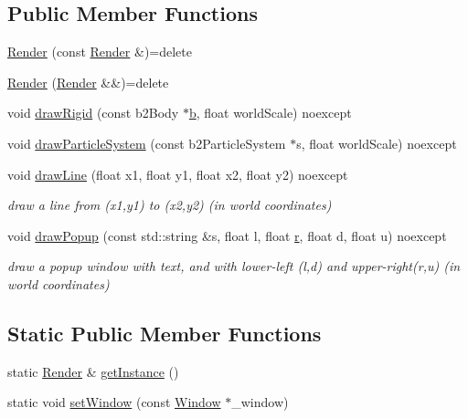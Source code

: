 \subsection*{Public Member Functions}
\begin{DoxyCompactItemize}
\item 
\hyperlink{classRender_a9efce92fa87e96980f4e413ee0cb6843}{Render} (const \hyperlink{classRender}{Render} \&)=delete
\item 
\hyperlink{classRender_a6e1a004027eff97cb3dfc9f012dde498}{Render} (\hyperlink{classRender}{Render} \&\&)=delete
\item 
void \hyperlink{classRender_a18f55be699e0bd8d20a5462330d5c9df}{draw\+Rigid} (const b2\+Body $\ast$\hyperlink{image_8h_ab2d05693952610f937e5acb3c4a8fa1b}{b}, float world\+Scale) noexcept
\item 
void \hyperlink{classRender_a14b83adbf9e351b9f11383abeef2ca63}{draw\+Particle\+System} (const b2\+Particle\+System $\ast$s, float world\+Scale) noexcept
\item 
void \hyperlink{classRender_a4f2ee414b80bf5e1e1ffcfe80c33218a}{draw\+Line} (float x1, float y1, float x2, float y2) noexcept
\begin{DoxyCompactList}\small\item\em draw a line from (x1,y1) to (x2,y2) (in world coordinates) \end{DoxyCompactList}\item 
void \hyperlink{classRender_ac30bcc966a9aa9de650a80cbfc600bb1}{draw\+Popup} (const std\+::string \&s, float l, float \hyperlink{image_8h_a62969232668331297e2dca1ae2ddd10d}{r}, float d, float u) noexcept
\begin{DoxyCompactList}\small\item\em draw a popup window with text, and with lower-\/left (l,d) and upper-\/right(r,u) (in world coordinates) \end{DoxyCompactList}\end{DoxyCompactItemize}
\subsection*{Static Public Member Functions}
\begin{DoxyCompactItemize}
\item 
static \hyperlink{classRender}{Render} \& \hyperlink{classRender_add2a1980ba1c0d0bce85943405f87c68}{get\+Instance} ()
\item 
static void \hyperlink{classRender_ae6344724a34c4ec00fc3f9de97a7cdb6}{set\+Window} (const \hyperlink{classWindow}{Window} $\ast$\+\_\+window)
\end{DoxyCompactItemize}
